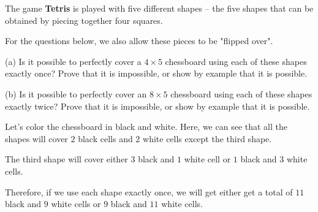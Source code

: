 \begin{problem}
  The game \textbf{Tetris} is played with five different shapes -- the five shapes that can be obtained by piecing together four squares.

\bigbreak

\bigbreak

	For the questions below, we also allow these pieces to be "flipped over".

	(a) Is it possible to perfectly cover a $4 \times 5$ chessboard using each of these shapes exactly once? Prove that it is impossible, or show by example that it is possible.

	(b) Is it possible to perfectly cover an $8 \times 5$ chessboard using each of these shapes exactly twice? Prove that it is impossible, or show by example that it is possible.
\end{problem}

\begin{scratch}
	Let's color the chessboard in black and white. Here, we can see that all the shapes will cover $2$ black cells and $2$ white cells except the third shape.

	The third shape will cover either $3$ black and $1$ white cell or $1$ black and $3$ white cells.

	Therefore, if we use each shape exactly once, we will get either get a total of $11$ black and $9$ white cells or $9$ black and $11$ white cells.
\end{scratch}

